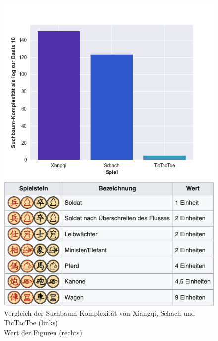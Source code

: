 \documentclass[
  manuscript=article,  %
  layout=publish,  %
  year=2023,
  volume=1,
]{extra/joas}
\begin{document}
\begin{figure}
  \centering
    \begin{minipage}{0.49\textwidth}
    \includegraphics[width=\textwidth]{imgs/gameComplexity.png}
  \end{minipage}
  \hfill
  \begin{minipage}{0.49\textwidth}
    \centering
    \includegraphics[width={\textwidth}]{imgs/Wert.png}
  \end{minipage}
  \captionsetup{justification=centering}
  \caption{Vergleich der Suchbaum-Komplexität von Xiangqi, Schach und TicTacToe (links) \\ Wert der Figuren (rechts)}
  \label{fig:compAndValue}
\end{figure}
\end{document}
